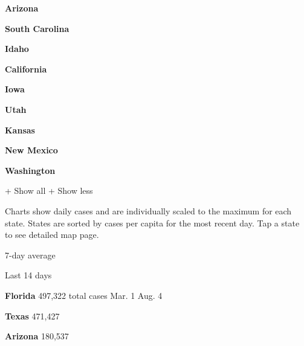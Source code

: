 \textbf{Arizona}

\href{https://www.nytimes3xbfgragh.onion/interactive/2020/us/south-carolina-coronavirus-cases.html}{}

\textbf{South Carolina}

\href{https://www.nytimes3xbfgragh.onion/interactive/2020/us/idaho-coronavirus-cases.html}{}

\textbf{Idaho}

\href{https://www.nytimes3xbfgragh.onion/interactive/2020/us/california-coronavirus-cases.html}{}

\textbf{California}

\href{https://www.nytimes3xbfgragh.onion/interactive/2020/us/iowa-coronavirus-cases.html}{}

\textbf{Iowa}

\href{https://www.nytimes3xbfgragh.onion/interactive/2020/us/utah-coronavirus-cases.html}{}

\textbf{Utah}

\href{https://www.nytimes3xbfgragh.onion/interactive/2020/us/kansas-coronavirus-cases.html}{}

\textbf{Kansas}

\href{https://www.nytimes3xbfgragh.onion/interactive/2020/us/new-mexico-coronavirus-cases.html}{}

\textbf{New Mexico}

\href{https://www.nytimes3xbfgragh.onion/interactive/2020/us/washington-coronavirus-cases.html}{}

\textbf{Washington}

+ Show all + Show less

Charts show daily cases and are individually scaled to the maximum for
each state. States are sorted by cases per capita for the most recent
day. Tap a state to see detailed map page.

\href{https://www.nytimes3xbfgragh.onion/interactive/2020/us/florida-coronavirus-cases.html}{}

7-day average

Last 14 days

\textbf{Florida} 497,322 total cases Mar. 1 Aug. 4

\href{https://www.nytimes3xbfgragh.onion/interactive/2020/us/texas-coronavirus-cases.html}{}

\textbf{Texas} 471,427

\href{https://www.nytimes3xbfgragh.onion/interactive/2020/us/arizona-coronavirus-cases.html}{}

\textbf{Arizona} 180,537

